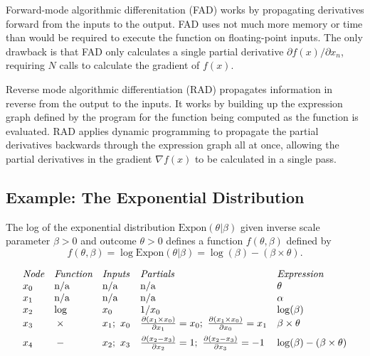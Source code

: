 \documentclass[11pt]{article}
\begin{document}
Forward-mode algorithmic differenitation (FAD) works by propagating
derivatives forward from the inputs to the output.  FAD uses not much
more memory or time than would be required to execute the function on
floating-point inputs.  The only drawback is that FAD only calculates
a single partial derivative $\partial f(x)/\partial x_n$, requiring
$N$ calls to calculate the gradient of $f(x)$.

Reverse mode algorithmic differentiation (RAD) propagates information
in reverse from the output to the inputs.  It works by building up the
expression graph defined by the program for the function being
computed as the function is evaluated.  RAD applies dynamic
programming to propagate the partial derivatives backwards through the
expression graph all at once, allowing the partial derivatives in
the gradient $\nabla f(x)$ to be calculated in a single pass.

\subsection{Example: The Exponential Distribution}

The log of the exponential distribution $\mbox{Expon}(\theta|\beta)$
given inverse scale parameter $\beta > 0$ and outcome $\theta > 0$ 
defines a function $f(\theta,\beta)$ defined by
%
\[
f(\theta,\beta) 
= \log \mbox{Expon}(\theta|\beta)
= \log(\beta)  - ( \beta \times \theta ).
\]
%

\[
\begin{array}{lllll}
\mbox{\it Node} & \mbox{\it Function} & \mbox{\it Inputs} & \mbox{\it
  Partials} & \mbox{\it Expression}
\\
x_0 &  \mbox{n/a} & \mbox{n/a} & \mbox{n/a} & \theta
\\
x_1 &  \mbox{n/a} & \mbox{n/a} & \mbox{n/a} & \alpha
\\
x_2 &  \log {} & x_0 & 1/x_0 & \log(\beta)
\\
x_3 &  {} \times {} & x_1; \ x_0 & 
\frac{\partial (x_1 \times x_0)}{\partial x_1} = x_0; \
\frac{\partial (x_1 \times x_0)}{\partial x_0} = x_1
& \beta \times \theta
\\[6pt]
x_4 &  {} - {} & x_2; \ x_3 & 
\frac{\partial (x_2 -x_3)}{\partial x_2} = 1; \ 
\frac{\partial (x_2 - x_3)}{\partial x_3} = -1
& \log(\beta) - (\beta \times \theta)
\end{array}
\]
\end{document}
